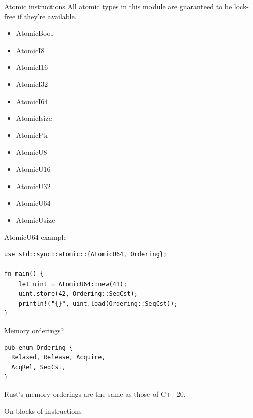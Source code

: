 \documentclass{beamer}
\begin{document}
\begin{frame}[fragile]{Atomic instructions}
  All atomic types in this module are guaranteed to be lock-free if they're available.

  \vspace{15pt}
  \begin{minipage}[l]{0.45\textwidth}
    \begin{itemize}
      \item AtomicBool
      \item AtomicI8
      \item AtomicI16
      \item AtomicI32
      \item AtomicI64
      \item AtomicIsize
    \end{itemize}
  \end{minipage}
  \begin{minipage}[l]{0.45\textwidth}
    \begin{itemize}
      \item AtomicPtr
      \item AtomicU8
      \item AtomicU16
      \item AtomicU32
      \item AtomicU64
      \item AtomicUsize
    \end{itemize}
  \end{minipage}
\end{frame}

\begin{frame}[fragile]{AtomicU64 example}
  \begin{verbatim}
use std::sync::atomic::{AtomicU64, Ordering};
  
fn main() {
    let uint = AtomicU64::new(41);
    uint.store(42, Ordering::SeqCst);
    println!("{}", uint.load(Ordering::SeqCst));
}
  \end{verbatim}

  Memory orderings?

  \begin{verbatim}
pub enum Ordering {
  Relaxed, Release, Acquire,
  AcqRel, SeqCst,
}
  \end{verbatim}

  Rust's memory orderings are the same as those of C++20.
\end{frame}

\begin{frame}[standout]
  On blocks of instructions
\end{frame}
\end{document}
